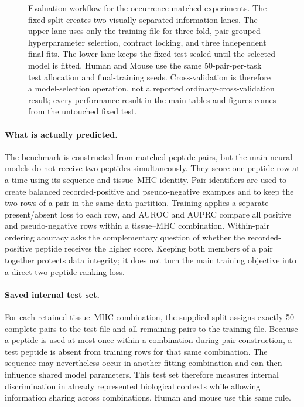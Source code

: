 \begin{figure}[t]
{
}
\caption{Evaluation workflow for the occurrence-matched experiments. The fixed split creates two visually separated information lanes. The upper lane uses only the training file for three-fold, pair-grouped hyperparameter selection, contract locking, and three independent final fits. The lower lane keeps the fixed test sealed until the selected model is fitted. Human and Mouse use the same 50-pair-per-task test allocation and final-training seeds. Cross-validation is therefore a model-selection operation, not a reported ordinary-cross-validation result; every performance result in the main tables and figures comes from the untouched fixed test.}
\label{fig:evaluation-setting-relationships}
\end{figure}

\paragraph{What is actually predicted.}
The benchmark is constructed from matched peptide pairs, but the main neural models do not receive two peptides simultaneously. They score one peptide row at a time using its sequence and tissue--MHC identity. Pair identifiers are used to create balanced recorded-positive and pseudo-negative examples and to keep the two rows of a pair in the same data partition. Training applies a separate present/absent loss to each row, and AUROC and AUPRC compare all positive and pseudo-negative rows within a tissue--MHC combination. Within-pair ordering accuracy asks the complementary question of whether the recorded-positive peptide receives the higher score. Keeping both members of a pair together protects data integrity; it does not turn the main training objective into a direct two-peptide ranking loss.

\paragraph{Saved internal test set.}
For each retained tissue--MHC combination, the supplied split assigns exactly 50 complete pairs to the test file and all remaining pairs to the training file. Because a peptide is used at most once within a combination during pair construction, a test peptide is absent from training rows for that same combination. The sequence may nevertheless occur in another fitting combination and can then influence shared model parameters. This test set therefore measures internal discrimination in already represented biological contexts while allowing information sharing across combinations. Human and mouse use this same rule.


